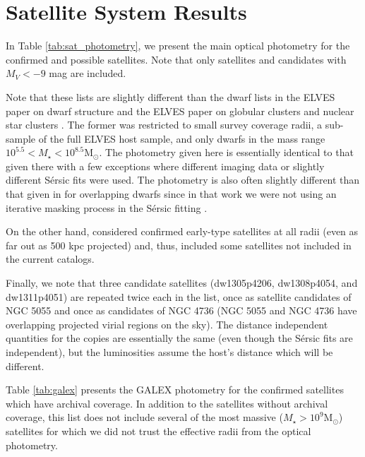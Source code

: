 \documentclass[twocolumn]{aastex62}
\newcommand{\msun}{M$_\odot$}
\begin{document}





\section{Satellite System Results}
\label{app:sat_lists}
In Table \ref{tab:sat_photometry}, we present the main optical photometry for the confirmed and possible satellites. Note that only satellites and candidates with $M_V<-9$ mag are included.





Note that these lists are slightly different than the dwarf lists in the ELVES paper on dwarf structure \citep{carlsten2021a} and the ELVES paper on globular clusters and nuclear star clusters \citep{carlsten2021b}. The former was restricted to small survey coverage radii, a sub-sample of the full ELVES host sample, and only dwarfs in the mass range $10^{5.5}<M_\star<10^{8.5}$\msun. The photometry given here is essentially identical to that given there with a few exceptions where different imaging data or slightly different S\'{e}rsic fits were used. The photometry is also often slightly different than that given in \citet{carlsten2020b} for overlapping dwarfs since in that work we were not using an iterative masking process in the S\'{e}rsic fitting \citep[see][for an in-depth description of this]{carlsten2021a}.

On the other hand, \citet{carlsten2021b} considered confirmed early-type satellites at all radii (even as far out as 500 kpc projected) and, thus, included some satellites not included in the current catalogs.


Finally, we note that three candidate satellites (dw1305p4206, dw1308p4054, and dw1311p4051) are repeated twice each in the list, once as satellite candidates of NGC 5055 and once as candidates of NGC 4736 (NGC 5055 and NGC 4736 have overlapping projected virial regions on the sky). The distance independent quantities for the copies are essentially the same (even though the S\'{e}rsic fits are independent), but the luminosities assume the host's distance which will be different.



Table \ref{tab:galex} presents the GALEX photometry for the confirmed satellites which have archival coverage. In addition to the satellites without archival coverage, this list does not include several of the most massive ($M_\star>10^9$\msun) satellites for which we did not trust the effective radii from the optical photometry. 
\end{document}
